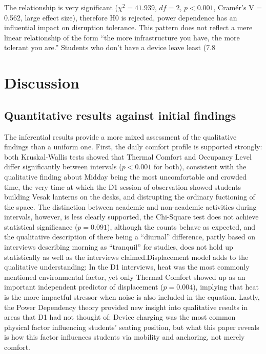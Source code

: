\documentclass[12pt, a4paper]{report}
\begin{document}
The relationship is very significant ($\chi^2 = 41.939$, $df = 2$, $p < 0.001$, Cram\'er's V = 0.562, large effect size), therefore H0 is rejected, power dependence has an influential impact on disruption tolerance. This pattern does not reflect a mere linear relationship of the form “the more infrastructure you have, the more tolerant you are.” Students who don’t have a device leave least (7.8%

\chapter{Discussion}

\section{Quantitative results against initial findings}
The inferential results provide a more mixed assessment of the qualitative findings than a uniform one. First, the daily comfort profile is supported strongly: both Kruskal-Wallis tests showed that Thermal Comfort and Occupancy Level differ significantly between intervals ($p < 0.001$ for both), consistent with the qualitative finding about Midday being the most uncomfortable and crowded time, the very time at which the D1 session of observation showed students building Vesak lanterns on the desks, and distrupting the ordinary fuctioning of the space. The distinction between academic and non-academic activities during intervals, however, is less clearly supported, the Chi-Square test does not achieve statistical significance ($p = 0.091$), although the counts behave as expected, and the qualitative description of there being a “diurnal” difference, partly based on interviews describing morning as “tranquil” for studies, does not hold up statistically as well as the interviews claimed.Displacement model adds to the qualitative understanding: In the D1 interviews, heat was the most commonly mentioned environmental factor, yet only Thermal Comfort showed up as an important independent predictor of displacement ($p = 0.004$), implying that heat is the more impactful stressor when noise is also included in the equation. Lastly, the Power Dependency theory provided new insight into qualitative results in areas that D1 had not thought of: Device charging was the most common physical factor influencing students' seating position, but what this paper reveals is how this factor influences students via mobility and anchoring, not merely comfort.
\end{document}
